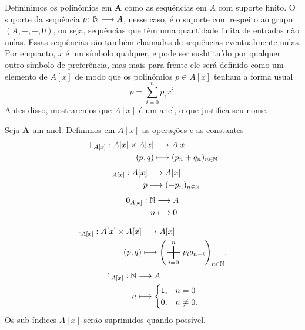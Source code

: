 Defininimos os polinômios em $\bm A$ como as sequências em $A$ com suporte finito. O suporte da sequência $p\colon \mathbb{N} \longrightarrow A$, nesse caso, é o suporte com respeito ao grupo $(A,+,-,0)$, ou seja, sequências que têm uma quantidade finita de entradas não nulas. Essas sequências são também chamadas de sequências eventualmente nulas. Por enquanto, $x$ é um símbolo qualquer, e pode ser susbtituído por qualquer outro símbolo de preferência, mas mais para frente ele será definido como um elemento de $A[x]$ de modo que os polinômios $p \in A[x]$ tenham a forma usual
	\begin{equation*}
	p = \sum_{i=0}^{n} p_i x^i.
	\end{equation*}
Antes disso, mostraremos que $A[x]$ é um anel, o que justifica seu nome.

\begin{defi}
Seja $\bm A$ um anel. Definimos em $A[x]$ as operações e as constantes
	\begin{align*}
	{+_{A[x]}}: {A[x] \times A[x]} &\longrightarrow {A[x]} \\{(p,q)} &\longmapsto {(p_n+q_n)_{n \in \mathbb{N}}}
	\end{align*}
	\begin{align*}
	{-_{A[x]}}: {A[x]} &\longrightarrow {A[x]} \\{p} &\longmapsto {(-p_n)_{n \in \mathbb{N}}}
	\end{align*}
	\begin{align*}
	{0_{A[x]}}: {\mathbb{N}} &\longrightarrow {A} \\{n} &\longmapsto {0}
	\end{align*}

	\begin{align*}
	\func{\cdot_{A[x]}}{A[x] \times A[x]}{A[x]}{(p,q)}{\left(\sum_{i=0}^n p_i q_{n-i}\right)_{n \in \N}}.
	\end{align*}
	\begin{align*}
	{1_{A[x]}}: {\mathbb{N}} &\longrightarrow {A} \\{n} &\longmapsto {\begin{cases}
		1,& n=0 \\
		0,& n\neq0.
	\end{cases}}
	\end{align*}
Os sub-índices $A[x]$ serão suprimidos quando possível.
\end{defi}


